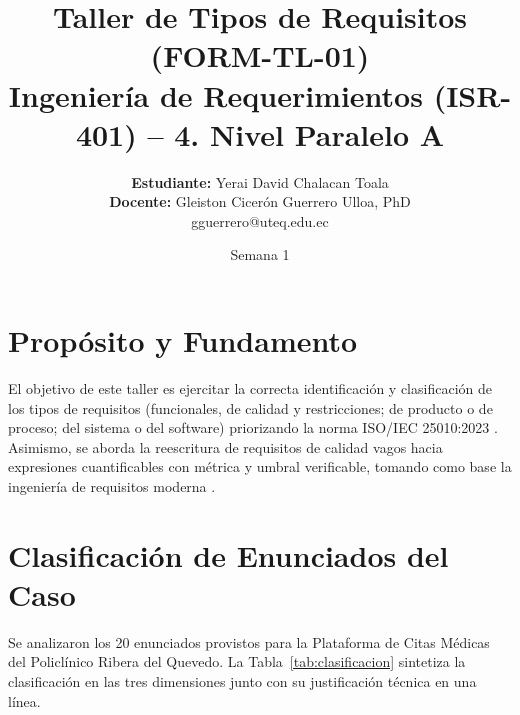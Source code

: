 \documentclass[11pt, a4paper]{article}
\title{\textbf{Taller de Tipos de Requisitos (FORM-TL-01)}\\ \large Ingeniería de Requerimientos (ISR-401) -- 4.\textordmasculine{} Nivel Paralelo A}
\author{\textbf{Estudiante:} Yerai David Chalacan Toala \\ \textbf{Docente:} Gleiston Cicer\'on Guerrero Ulloa, PhD \\ gguerrero@uteq.edu.ec}
\date{Semana 1}
\begin{document}
\maketitle

\section{Prop\'osito y Fundamento}
El objetivo de este taller es ejercitar la correcta identificaci\'on y clasificaci\'on de los tipos de requisitos (funcionales, de calidad y restricciones; de producto o de proceso; del sistema o del software) priorizando la norma ISO/IEC 25010:2023 \cite{iso25010}. Asimismo, se aborda la reescritura de requisitos de calidad vagos hacia expresiones cuantificables con m\'etrica y umbral verificable, tomando como base la ingenier\'ia de requisitos moderna \cite{pohl2025, iso29148}.

\section{Clasificaci\'on de Enunciados del Caso}
Se analizaron los 20 enunciados provistos para la Plataforma de Citas M\'edicas del Policl\'inico Ribera del Quevedo. La Tabla~\ref{tab:clasificacion} sintetiza la clasificaci\'on en las tres dimensiones junto con su justificaci\'on t\'ecnica en una l\'inea.
\end{document}
